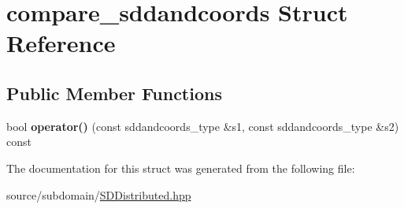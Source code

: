 \hypertarget{structcompare__sddandcoords}{}\section{compare\+\_\+sddandcoords Struct Reference}
\label{structcompare__sddandcoords}
\subsection*{Public Member Functions}
\begin{DoxyCompactItemize}
\item 
\mbox{\label{structcompare__sddandcoords_ab03bff248c467c2f312914668aec8927}} 
bool {\bfseries operator()} (const sddandcoords\+\_\+type \&s1, const sddandcoords\+\_\+type \&s2) const
\end{DoxyCompactItemize}


The documentation for this struct was generated from the following file\+:\begin{DoxyCompactItemize}
\item 
source/subdomain/\mbox{\hyperlink{SDDistributed_8hpp}{S\+D\+Distributed.\+hpp}}\end{DoxyCompactItemize}
